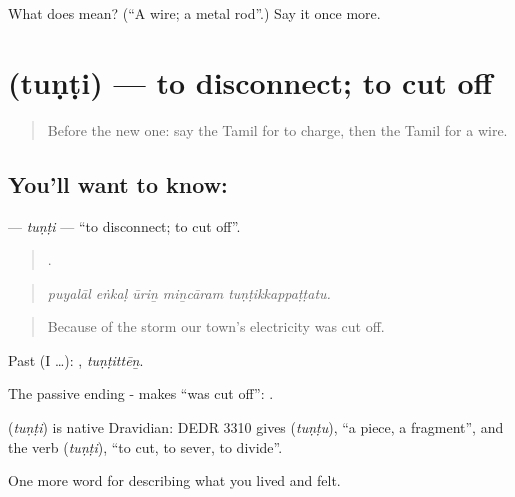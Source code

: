 \begin{tcolorbox}[breakable,colback=teal!4,colframe=teal!35!black,title={Before you move on}]
What does  mean? (\textquotedblleft{}A wire; a metal rod\textquotedblright{}.) Say it once more.
\end{tcolorbox}
\section[\texorpdfstring{\ta{துண்டி} (tuṇṭi)}{துண்டி (tuṇṭi)}]{ (tuṇṭi) — to disconnect; to cut off}

\label{lesson:TA-C517-tunti}



\begin{quote}
Before the new one: say the Tamil for to charge, then the Tamil for a wire.
\end{quote}

\subsection*{You'll want to know: }
\textbf{} — \emph{tuṇṭi} — \textquotedblleft{}to disconnect; to cut off\textquotedblright{}.

\begin{quote}
    .
\end{quote}

\begin{quote}
\emph{puyalāl eṅkaḷ ūriṉ miṉcāram tuṇṭikkappaṭṭatu.}
\end{quote}

\begin{quote}
Because of the storm our town's electricity was cut off.
\end{quote}

Past (I …): , \emph{tuṇṭittēṉ}.

The passive ending - makes \textquotedblleft{}was cut off\textquotedblright{}: .

\begin{cousinweb}
\textbf{} (\emph{tuṇṭi}) is native Dravidian: DEDR 3310 gives  (\emph{tuṇṭu}), \textquotedblleft{}a piece, a fragment\textquotedblright{}, and the verb  (\emph{tuṇṭi}), \textquotedblleft{}to cut, to sever, to divide\textquotedblright{}.
\end{cousinweb}

\begin{grammarlens}[title={What you've built}]
One more word for describing what you lived and felt.
\end{grammarlens}

